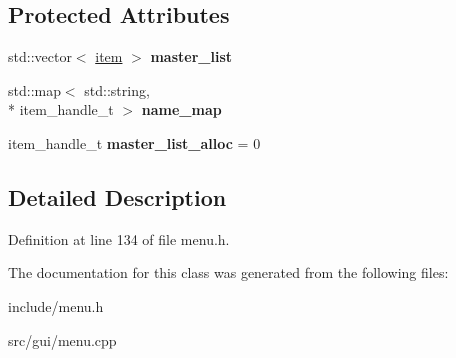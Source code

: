 \subsection*{Protected Attributes}
\begin{DoxyCompactItemize}
\item 
\hypertarget{classDOSBoxMenu_ad2a347d84ac94b3c021838429bf2e128}{std\-::vector$<$ \hyperlink{classDOSBoxMenu_1_1item}{item} $>$ {\bfseries master\-\_\-list}}\label{classDOSBoxMenu_ad2a347d84ac94b3c021838429bf2e128}

\item 
\hypertarget{classDOSBoxMenu_af85ccb33204bfee0d93cbd73b334443f}{std\-::map$<$ std\-::string, \\*
item\-\_\-handle\-\_\-t $>$ {\bfseries name\-\_\-map}}\label{classDOSBoxMenu_af85ccb33204bfee0d93cbd73b334443f}

\item 
\hypertarget{classDOSBoxMenu_a8dd5513e70a30740a14ca14dd93c384a}{item\-\_\-handle\-\_\-t {\bfseries master\-\_\-list\-\_\-alloc} = 0}\label{classDOSBoxMenu_a8dd5513e70a30740a14ca14dd93c384a}

\end{DoxyCompactItemize}


\subsection{Detailed Description}


Definition at line 134 of file menu.\-h.



The documentation for this class was generated from the following files\-:\begin{DoxyCompactItemize}
\item 
include/menu.\-h\item 
src/gui/menu.\-cpp\end{DoxyCompactItemize}
